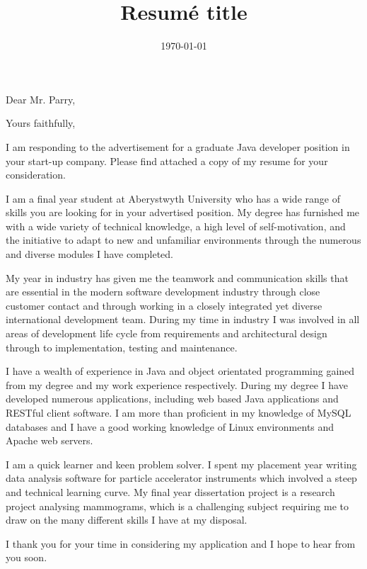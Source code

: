 \documentclass[11pt,a4paper,sans]{moderncv}        %
\title{Resumé title}                               %
\begin{document}
\date{\today}
\opening{Dear Mr. Parry,}
\closing{Yours faithfully,}
\makelettertitle

I am responding to the advertisement for a graduate Java developer position in your start-up company. Please find attached a copy of my resume for your consideration.

I am a final year student at Aberystwyth University who has a wide range of skills you are looking for in your advertised position. My degree has furnished me with a wide variety of technical knowledge, a high level of self-motivation, and the initiative to adapt to new and unfamiliar environments through the numerous and diverse modules I have completed. 

My year in industry has given me the teamwork and communication skills that are essential in the modern software development industry through close customer contact and through working in a closely integrated yet diverse international development team. During my time in industry I was involved in all areas of development life cycle from requirements and architectural design through to implementation, testing and maintenance.

I have a wealth of experience in Java and object orientated programming gained from my degree and my work experience respectively. During my degree I have developed numerous applications, including web based Java applications and RESTful client software. I am more than proficient in my knowledge of MySQL databases and I have a good working knowledge of Linux environments and Apache web servers.

I am a quick learner and keen problem solver. I spent my placement year writing data analysis software for particle accelerator instruments which involved a steep and technical learning curve. My final year dissertation project is a research project analysing mammograms, which is a challenging subject requiring me to draw on the many different skills I have at my disposal.


I thank you for your time in considering my application and I hope to hear from you soon.

\makeletterclosing
\end{document}

